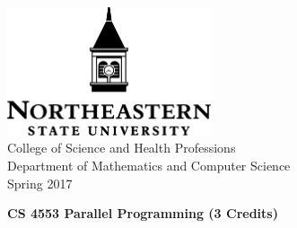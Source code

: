 \documentclass{article}
\begin{document}
\begin{center}
\includegraphics[width=6cm]{parp/tex/nsulogo} \\ \vspace{0.5cm}
College of Science and Health Professions \\
Department of Mathematics and Computer Science \\
Spring 2017
\end{center}

\textbf{\Large CS 4553 Parallel Programming (3 Credits)}
\end{document}
